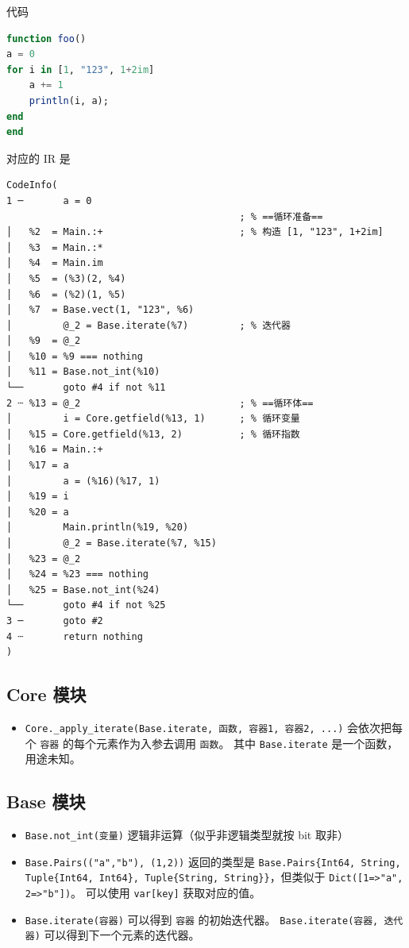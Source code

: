 代码
\begin{lstlisting}[language=julia]
function foo()
a = 0
for i in [1, "123", 1+2im]
    a += 1
    println(i, a);
end
end
\end{lstlisting}
对应的 IR 是
\begin{lstlisting}[language=none]
CodeInfo(
1 ─       a = 0
                                         ; % ==循环准备==
│   %2  = Main.:+                        ; % 构造 [1, "123", 1+2im]
│   %3  = Main.:*
│   %4  = Main.im
│   %5  = (%3)(2, %4)
│   %6  = (%2)(1, %5)
│   %7  = Base.vect(1, "123", %6)
│         @_2 = Base.iterate(%7)         ; % 迭代器
│   %9  = @_2
│   %10 = %9 === nothing
│   %11 = Base.not_int(%10)
└──       goto #4 if not %11
2 ┄ %13 = @_2                            ; % ==循环体==
│         i = Core.getfield(%13, 1)      ; % 循环变量
│   %15 = Core.getfield(%13, 2)          ; % 循环指数
│   %16 = Main.:+
│   %17 = a
│         a = (%16)(%17, 1)
│   %19 = i
│   %20 = a
│         Main.println(%19, %20)
│         @_2 = Base.iterate(%7, %15)
│   %23 = @_2
│   %24 = %23 === nothing
│   %25 = Base.not_int(%24)
└──       goto #4 if not %25
3 ─       goto #2
4 ┄       return nothing
)
\end{lstlisting}

\subsection{Core 模块}
\begin{itemize}
\item \verb`Core._apply_iterate(Base.iterate, 函数, 容器1, 容器2, ...)` 会依次把每个 \verb`容器` 的每个元素作为入参去调用 \verb`函数`。 其中 \verb`Base.iterate` 是一个函数，用途未知。
\end{itemize}

\subsection{Base 模块}
\begin{itemize}
\item \verb`Base.not_int(变量)` 逻辑非运算（似乎非逻辑类型就按 bit 取非）
\item \verb`Base.Pairs(("a","b"), (1,2))` 返回的类型是 \verb`Base.Pairs{Int64, String, Tuple{Int64, Int64}, Tuple{String, String}}`，但类似于 \verb`Dict([1=>"a", 2=>"b"])`。 可以使用 \verb`var[key]` 获取对应的值。
\item \verb`Base.iterate(容器)` 可以得到 \verb`容器` 的初始迭代器。 \verb`Base.iterate(容器, 迭代器)` 可以得到下一个元素的迭代器。
\end{itemize}

